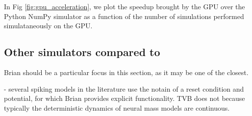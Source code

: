 	In Fig \ref{fig:gpu_acceleration}, we plot the speedup brought by the GPU
	over the Python NumPy simulator as a function of the number of simulations 
	performed simulataneously on the GPU.



\subsection{Other simulators compared to \TVB}

	Brian should be a particular focus in this section, as it may
	be one of the closest. 

	- several spiking models in the literature use the notain of a reset
		condition and potential, for which Brian provides explicit
		functionality. TVB does not because typically the deterministic
		dynamics of neural mass models are continuous.
